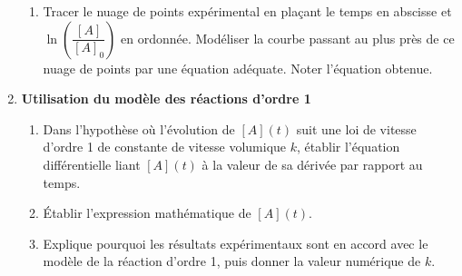 \documentclass[a4paper,11pt,fleqn]{article}%
\begin{document}
\begin{multicols}{2}
\begin{enumerate}
\begin{enumerate}
        \item Tracer le nuage de points expérimental en plaçant le temps en abscisse et $\ln{\left(\dfrac{[A]}{[A]_0}\right)}$ en ordonnée. Modéliser la courbe passant au plus près de ce nuage de points par une équation adéquate. Noter l'équation obtenue.
    \end{enumerate}
    \item \textbf{Utilisation du modèle des réactions d'ordre 1}
    \begin{enumerate}
        \item Dans l'hypothèse où l'évolution de $[A](t)$ suit une loi de vitesse d'ordre 1 de constante de vitesse volumique $k$, établir l'équation différentielle liant $[A](t)$ à la valeur de sa dérivée par rapport au temps.
        \item Établir l'expression mathématique de $[A](t)$.
        \item Explique pourquoi les résultats expérimentaux sont en accord avec le modèle de la réaction d'ordre 1, puis donner la valeur numérique de $k$.
    \end{enumerate}
\end{enumerate}
\end{multicols}
\end{document}
